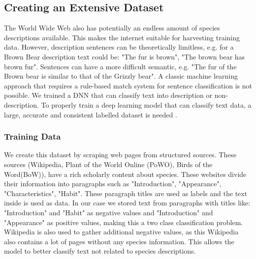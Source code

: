 \documentclass[a4paper, 12pt, oneside]{book} %
\begin{document}
\subsection{Creating an Extensive Dataset}
The World Wide Web also has potentially an endless amount of species descriptions available.
This makes the internet suitable for harvesting training data.
However, description sentences can be theoretically limitless, e.g. for a Brown Bear description text could be: "The fur is brown", "The brown bear has brown fur".
Sentences can have a more difficult semantic, e.g. "The fur of the Brown bear is similar to that of the Grizzly bear".
A classic machine learning approach that requires a rule-based match system for sentence classification is not possible. 
We trained a DNN that can classify text into description or non-description.
To properly train a deep learning model that can classify text data, a large, accurate and consistent labelled dataset is needed \autocite{munappy_data_2019}.

\subsubsection{Training Data}
We create this dataset by scraping web pages from structured sources.
These sources (Wikipedia, Plant of the World Online (PoWO), Birds of the Word(BoW)), have a rich scholarly content about species.
These websites divide their information into paragraphs such as "Introduction", "Appearance", "Characteristics", "Habit".
These paragraph titles are used as labels and the text inside is used as data.
In our case we stored text from paragraphs with titles like:  "Introduction" and "Habit" as negative values and "Introduction" and "Appearance" as positive values, making this a two class classification problem. 
Wikipedia is also used to gather additional negative values, as this Wikipedia also contains a lot of pages without any species information.
This allows the model to better classify text not related to species descriptions.


\end{document}
